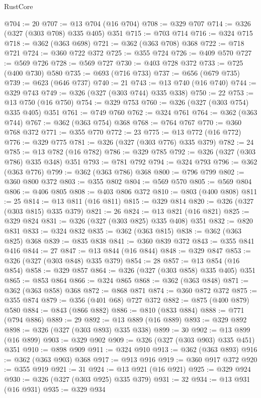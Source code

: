 \begin{lexlean}{RustCore}
\begin{coremodule}
@704 := 20
@707 := @13 @704 (@16 @704)
@708 := @329 @707
@714 := @326 (@327 (@303 @708) @335 @405) @351
@715 := @703 @714
@716 := @324 @715
@718 := @362 (@363 @698)
@721 := @362 (@363 @708) @368
@722 := @718 @721
@724 := @360 @722 @372
@725 := @355 @724
@726 := @409 @570
@727 := @569 @726
@728 := @569 @727
@730 := @403 @728 @372
@733 := @725 (@400 @730) @580
@735 := @693 (@716 @733)
@737 := @656 (@679 @735)
@739 := @623 (@646 @737)
@740 := 21
@743 := @13 @740 (@16 @740)
@744 := @329 @743
@749 := @326 (@327 (@303 @744) @335 @338)
@750 := 22
@753 := @13 @750 (@16 @750)
@754 := @329 @753
@760 := @326 (@327 (@303 @754) @335 @405) @351
@761 := @749 @760
@762 := @324 @761
@764 := @362 (@363 @744)
@767 := @362 (@363 @754) @368
@768 := @764 @767
@770 := @360 @768 @372
@771 := @355 @770
@772 := 23
@775 := @13 @772 (@16 @772)
@776 := @329 @775
@781 := @326 (@327 (@303 @776) @335 @379)
@782 := 24
@785 := @13 @782 (@16 @782)
@786 := @329 @785
@792 := @326 (@327 (@303 @786) @335 @348) @351
@793 := @781 @792
@794 := @324 @793
@796 := @362 (@363 @776)
@799 := @362 (@363 @786) @368
@800 := @796 @799
@802 := @360 @800 @372
@803 := @355 @802
@804 := @569 @570
@805 := @569 @804
@806 := @406 @805
@808 := @403 @806 @372
@810 := @803 (@400 @808)
@811 := 25
@814 := @13 @811 (@16 @811)
@815 := @329 @814
@820 := @326 (@327 (@303 @815) @335 @379)
@821 := 26
@824 := @13 @821 (@16 @821)
@825 := @329 @824
@831 := @326 (@327 (@303 @825) @335 @408) @351
@832 := @820 @831
@833 := @324 @832
@835 := @362 (@363 @815)
@838 := @362 (@363 @825) @368
@839 := @835 @838
@841 := @360 @839 @372
@843 := @355 @841 @416
@844 := 27
@847 := @13 @844 (@16 @844)
@848 := @329 @847
@853 := @326 (@327 (@303 @848) @335 @379)
@854 := 28
@857 := @13 @854 (@16 @854)
@858 := @329 @857
@864 := @326 (@327 (@303 @858) @335 @405) @351
@865 := @853 @864
@866 := @324 @865
@868 := @362 (@363 @848)
@871 := @362 (@363 @858) @368
@872 := @868 @871
@874 := @360 @872 @372
@875 := @355 @874
@879 := @356 (@401 @68) @727 @372
@882 := @875 (@400 @879) @580
@884 := @843 (@866 @882)
@886 := @810 (@833 @884)
@888 := @771 (@794 @886)
@889 := 29
@892 := @13 @889 (@16 @889)
@893 := @329 @892
@898 := @326 (@327 (@303 @893) @335 @338)
@899 := 30
@902 := @13 @899 (@16 @899)
@903 := @329 @902
@909 := @326 (@327 (@303 @903) @335 @451) @351
@910 := @898 @909
@911 := @324 @910
@913 := @362 (@363 @893)
@916 := @362 (@363 @903) @368
@917 := @913 @916
@919 := @360 @917 @372
@920 := @355 @919
@921 := 31
@924 := @13 @921 (@16 @921)
@925 := @329 @924
@930 := @326 (@327 (@303 @925) @335 @379)
@931 := 32
@934 := @13 @931 (@16 @931)
@935 := @329 @934

\end{coremodule}
\end{lexlean}
